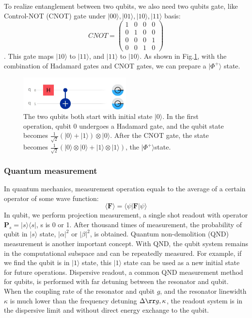 To realize entanglement between two qubits, we also need two qubits gate, like Control-NOT (CNOT) gate under $|00\rangle, |01\rangle, |10\rangle, |11\rangle$ basis:
\begin{equation}
    CNOT = 
    \begin{pmatrix}
1 & 0 & 0 & 0 \\
0 & 1 & 0 & 0 \\
0 & 0 & 0 & 1 \\
0 & 0 & 1 & 0 
\end{pmatrix}
\end{equation}
. This gate maps $|10\rangle$ to $|11\rangle$, and  $|11\rangle$ to  $|10\rangle$. As shown in Fig.\ref{phi+state}, with the combination of Hadamard gates and CNOT gates, we can prepare a $|\Phi^+\rangle$ state.
\begin{figure}[h!]
    \centering
    \includegraphics[width=0.5\textwidth]{Pic/Phi+state.jpg}
    \caption{The two qubits both start with initial state $|0\rangle$. In the first operation, qubit 0 undergoes a Hadamard gate, and the qubit state becomes $\frac{1}{\sqrt{2}}(|0\rangle+|1\rangle)\otimes|0\rangle$. After the CNOT gate, the state becomes $\frac{1}{\sqrt{2}}(|0\rangle\otimes|0\rangle + |1\rangle\otimes|1\rangle)$, the $|\Phi^+\rangle $state.}
    \label{phi+state}
\end{figure}

\subsubsection{Quantum measurement}
In quantum mechanics, measurement operation equals to the average of a certain operator of some wave function:
\begin{equation}
    \langle\mathbf{F}\rangle = \langle\psi|\mathbf{F}|\psi\rangle
\end{equation}
In qubit, we perform projection measurement, a single shot readout with operator $\mathbf{P}_s = |s\rangle\langle s|$, s is 0 or 1. After thousand times of measurement, the probability of qubit in $|s\rangle$ state, $|\alpha|^2$ or $|\beta|^2$, is obtained. Quantum non-demolition (QND) measurement is another important concept. With QND, the qubit system remains in the computational subspace and can be repeatedly measured. For example, if we find the qubit is in $|1\rangle$ state, this $|1\rangle$ state can be used as a new initial state for future operations. Dispersive readout, a common QND measurement method for qubits, is performed with far detuning between the resonator and qubit. When the coupling rate of the resonator and qubit $g$, and the resonator linewidth $\kappa$ is much lower than the frequency detuning $\Delta \rr g, \kappa$, the readout system is in the dispersive limit and without direct energy exchange to the qubit.


